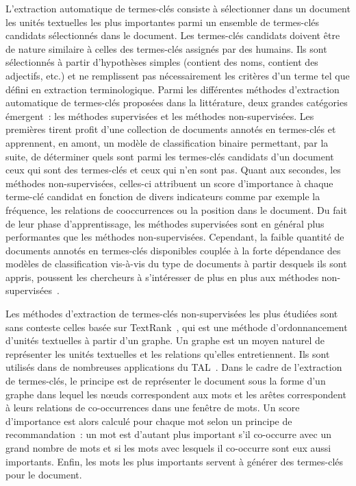   L'extraction automatique de termes-clés consiste à sélectionner dans un
  document les unités textuelles les plus importantes parmi un ensemble de
  termes-clés candidats sélectionnés dans le document. Les termes-clés candidats
  doivent être de nature similaire à celles des termes-clés assignés par des
  humains. Ils sont sélectionnés à partir d'hypothèses simples (contient des
  noms, contient des adjectifs, etc.) et ne remplissent pas nécessairement les
  critères d'un terme tel que défini en extraction terminologique. Parmi les
  différentes méthodes d'extraction automatique de termes-clés proposées dans la
  littérature, deux grandes catégories émergent~: les méthodes supervisées et
  les méthodes non-supervisées. Les premières tirent profit d'une collection de
  documents annotés en termes-clés et apprennent, en amont, un modèle de
  classification binaire permettant, par la suite, de déterminer quels sont
  parmi les termes-clés candidats d'un document ceux qui sont des termes-clés et
  ceux qui n'en sont pas. Quant aux secondes, les méthodes non-supervisées,
  celles-ci attribuent un score d'importance à chaque terme-clé candidat en
  fonction de divers indicateurs comme par exemple la fréquence, les relations
  de cooccurrences ou la position dans le document. Du fait de leur phase
  d'apprentissage, les méthodes supervisées sont en général plus performantes
  que les méthodes non-supervisées. Cependant, la faible quantité de documents
  annotés en termes-clés disponibles couplée à la forte dépendance des modèles
  de classification vis-à-vis du type de documents à partir desquels ils sont
  appris, poussent les chercheurs à s'intéresser de plus en plus aux méthodes
  non-supervisées~\cite{hassan2010conundrums}.

  Les méthodes d'extraction de termes-clés non-supervisées les plus étudiées
  sont sans conteste celles basée sur TextRank~\cite{mihalcea2004textrank}, qui
  est une méthode d'ordonnancement d'unités textuelles à partir d'un graphe. Un
  graphe est un moyen naturel de représenter les unités textuelles et les
  relations qu'elles entretiennent. Ils sont utilisés dans de nombreuses
  applications du TAL~\cite{kozareva2013textgraphs}. Dans le cadre de
  l'extraction de termes-clés, le principe est de représenter le document sous
  la forme d'un graphe dans lequel les n\oe{}uds correspondent aux mots et les
  arêtes correspondent à leurs relations de co-occurrences dans une fenêtre de
  mots. Un score d'importance est alors calculé pour chaque mot selon un
  principe de recommandation~: un mot est d'autant plus important
  s'il co-occurre avec un grand nombre de mots et si les mots avec lesquels il
  co-occurre sont eux aussi importants. Enfin, les mots les plus importants
  servent à générer des termes-clés pour le document.


